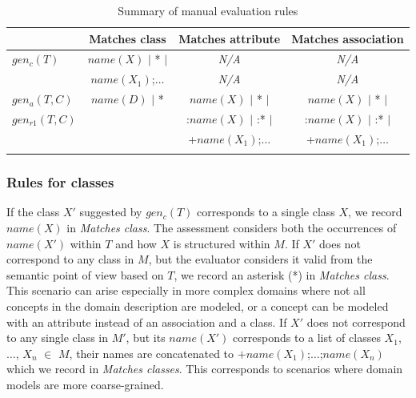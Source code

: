 \begin{table}[!h]
    \scriptsize
    \centering
    \setlength{\tabcolsep}{0.5em}
    \begin{tabular}{lccc}
             & Matches class & Matches attribute & Matches association \\
\toprule
\addlinespace
        $gen_c(T)$   & $name(X)$ $\vert$ * $\vert$ & \emph{N/A}  & \emph{N/A} \\
                     & $name(X_1)$;$\ldots$        & \emph{N/A}  & \emph{N/A} \\
\addlinespace
\midrule
\addlinespace
        $gen_a(T,C)$ & $name(D)$ $\vert$ *         & $name(X)$ $\vert$ * $\vert$ & $name(X)$ $\vert$ * $\vert$ \\
        $gen_{r1}(T,C)$ &                             & :$name(X)$ $\vert$ :* $\vert$ & :$name(X)$ $\vert$ :* $\vert$ \\
                     &                             & +$name(X_1)$;$\ldots$        & +$name(X_1)$;$\ldots$ \\
\addlinespace
\bottomrule
    \end{tabular}
    \caption{Summary of manual evaluation rules}
    \label{tab:manual-assessment-of-suggestions}
\end{table}


\subsubsection{Rules for classes}
If the class $X'$ suggested by $gen_c(T)$ corresponds to a single class $X$, we record $name(X)$ in \emph{Matches class}.
The assessment considers both the occurrences of $name(X')$ within $T$ and how $X$ is structured within $M$.
If $X'$ does not correspond to any class in $M$, but the evaluator considers it valid from the semantic point of view based on $T$, we record an asterisk (*) in \emph{Matches class}.
This scenario can arise especially in more complex domains where not all concepts in the domain description are modeled, or a concept can be modeled with an attribute instead of an association and a class.
If $X'$ does not correspond to any single class in $M'$, but its $name(X')$ corresponds to a list of classes $X_1$, $\ldots$, $X_n$ $\in$ $M$, their names are concatenated to $+name(X_1)$;$\ldots$;$name(X_n)$ which we record in \emph{Matches classes}. This corresponds to scenarios where domain models are more coarse-grained.

